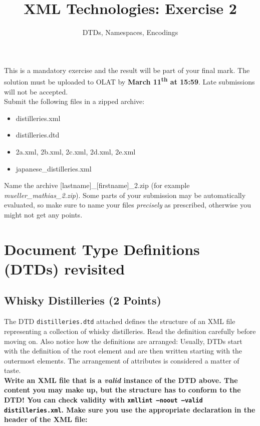 \documentclass[a4paper, 12pt]{scrartcl}
\title{XML Technologies: Exercise 2}
\date{}
\subtitle{DTDs, Namespaces, Encodings}
\begin{document}
\maketitle\vspace{-12ex}

\noindent This is a mandatory exercise and the result will be part of your final mark. The solution must be uploaded to OLAT by \textbf{March 11\textsuperscript{th} at 15:59}. Late submissions will not be accepted.\\



\noindent Submit the following files in a zipped archive:
\begin{itemize}
\item distilleries.xml
\item distilleries.dtd
\item 2a.xml, 2b.xml, 2c.xml, 2d.xml, 2e.xml
\item japanese\_distilleries.xml
\end{itemize}

\noindent Name the archive [lastname]\_[firstname]\_2.zip (for example \textit{mueller\_mathias\_2.zip}). Some parts of your submission may be automatically evaluated, so make sure to name your files \textit{precisely} as prescribed, otherwise you might not get any points.

\section{Document Type Definitions (DTDs) revisited}

\subsection{Whisky Distilleries (2 Points)}

The DTD \texttt{distilleries.dtd} attached defines the structure of an XML file representing a collection of whisky distilleries. Read the definition carefully before moving on. Also notice how the definitions are arranged: Usually, DTDs start with the definition of the root element and are then written starting with the outermost elements. The arrangement of attributes is considered a matter of taste.\\

\noindent \textbf{Write an XML file that is a \textit{valid} instance of the DTD above. The content you may make up, but the structure has to conform to the DTD! You can check validity with \texttt{xmllint --noout --valid distilleries.xml}. Make sure you use the appropriate declaration in the header of the XML file:}
\end{document}
